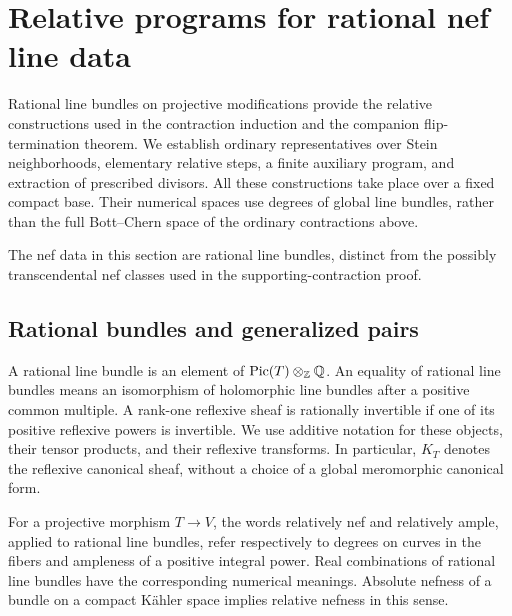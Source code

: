 \section{Relative programs for rational nef line data}\label{sec:relative}

Rational line bundles on projective modifications provide the relative
constructions used in the contraction induction and the companion
flip-termination theorem. We establish ordinary representatives over Stein
neighborhoods, elementary relative steps, a finite auxiliary program,
and extraction of prescribed divisors. All these constructions take
place over a fixed compact base.  Their numerical spaces use degrees
of global line bundles, rather than the full Bott--Chern space of the
ordinary contractions above.

The nef data in this section are rational line bundles, distinct from the
possibly transcendental nef classes used in the supporting-contraction proof.

\subsection{Rational bundles and generalized pairs}

\begin{convention}\label{conv:rational-bundles}
A rational line bundle is an element of $\operatorname{Pic}(T)\otimes_{\mathbb Z}\mathbb Q$.
An equality of rational line bundles means an isomorphism of holomorphic
line bundles after a positive common multiple.  A rank-one reflexive
sheaf is rationally invertible if one of its positive reflexive powers
is invertible.  We use additive notation for these objects, their
tensor products, and their reflexive transforms.  In particular, $K_T$
denotes the reflexive canonical sheaf, without a choice of a global
meromorphic canonical form.

For a projective morphism $T\to V$, the words relatively nef and
relatively ample, applied to rational line bundles, refer respectively
to degrees on curves in the fibers and ampleness of a positive integral
power.  Real combinations of rational line bundles have the corresponding
numerical meanings.  Absolute nefness of a bundle on a compact K\"ahler
space implies relative nefness in this sense.
\end{convention}

